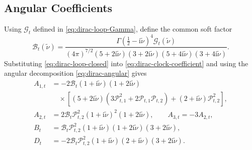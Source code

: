 \documentclass[a4paper,12pt]{article}
\newcommand{\ii}{\mathrm i}
\newcommand{\tn}{\tilde\nu}
\begin{document}
\subsection{Angular Coefficients}
\label{app:dirac-coefficients}
Using $\mathcal G_t$ defined in \eqref{eq:dirac-loop-Gamma}, define
the common soft factor
\begin{equation}
 \mathcal B_{t}(\tn)=
 \frac{\Gamma(\tfrac12-\ii\tn)^4
 \mathcal G_t(\tn)}
 {(4\pi)^{7/2}(5+2\ii\tn)(3+2\ii\tn)
 (5+4\ii\tn)(3+4\ii\tn)}.
 \label{eq:dirac-common-factor}
\end{equation}
Substituting \eqref{eq:dirac-loop-closed} into
\eqref{eq:dirac-clock-coefficient} and using the angular decomposition
\eqref{eq:dirac-angular} gives
\begin{align}
 A_{1,t}&=-2\mathcal B_{t}(1+\ii\tn)(1+2\ii\tn)
 \nonumber\\
 &\quad\times\left[(5+2\ii\tn)(3\mathcal P_{t,1}^2
 +2\mathcal P_{t,1}\mathcal P_{t,2})
 +(2+\ii\tn)\mathcal P_{t,2}^2\right],\nonumber\\
 A_{2,t}&=2\mathcal B_{t}\mathcal P_{t,2}^2
 (1+\ii\tn)^2(1+2\ii\tn),
 \qquad A_{3,t}=-3A_{2,t},\nonumber\\
 B_{t}&=\mathcal B_{t}\mathcal P_{t,2}^2
       (1+\ii\tn)(1+2\ii\tn)(3+2\ii\tn),\nonumber\\
 D_{t}&=-2\mathcal B_{t}\mathcal P_{t,2}^2
       (1+\ii\tn)(2+\ii\tn)(3+2\ii\tn).
 \label{eq:dirac-angular-closed}
\end{align}
\end{document}
